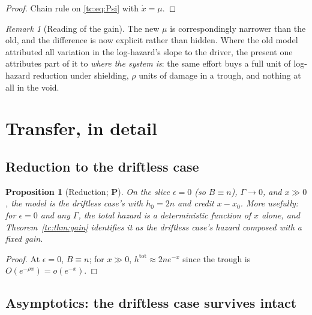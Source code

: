 \documentclass[11pt]{article}
\numberwithin{equation}{section}
\theoremstyle{plain}
\newtheorem{proposition}[theorem]{Proposition}
\theoremstyle{definition}
\theoremstyle{remark}
\newtheorem{remark}[theorem]{Remark}
\begin{document}
\begin{proof}
Chain rule on \eqref{tc:eq:Psi} with $\dot x=\mu$.
\end{proof}

\begin{remark}[Reading of the gain]\label{tc:rem:gainreading}
The new $\mu$ is correspondingly narrower than the old, and the
difference is now explicit rather than hidden. Where the old model
attributed all variation in the log-hazard's slope to the driver, the
present one attributes part of it to \emph{where the system is}: the
same effort buys a full unit of log-hazard reduction under shielding,
$\rho$ units of damage in a trough, and nothing at all in the void.
\end{remark}

\section{Transfer, in detail}\label{app:transfer}

\subsection{Reduction to the driftless case}\label{tc:subsub:reduction}

\begin{proposition}[Reduction; \textbf{P}]\label{tc:prop:reduction}
On the slice $\epsilon=0$ (so $B\equiv n$), $\Gamma\to0$, and $x\gg0$,
the model is the driftless case's with $h_0=2n$ and credit $x-x_0$. More
usefully: for $\epsilon=0$ and any $\Gamma$, the total hazard is a
deterministic function of $x$ alone, and Theorem~\ref{tc:thm:gain}
identifies it as the driftless case's hazard composed with a fixed gain.
\end{proposition}

\begin{proof}
At $\epsilon=0$, $B\equiv n$; for $x\gg0$, $h^{\mathrm{tot}}\approx
2ne^{-x}$ since the trough is $O(e^{-\rho x})=o(e^{-x})$.
\end{proof}

\subsection{Asymptotics: the driftless case survives intact}
\label{tc:sub:asymptotics}
\end{document}
